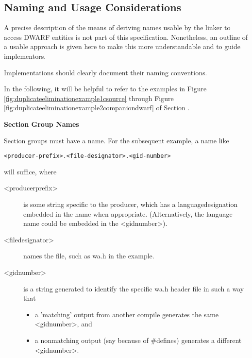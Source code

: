 \subsection{Naming and Usage Considerations}
\label{app:namingandusageconsiderations}

A precise description of the means of deriving names usable
by the linker to access DWARF entities is not part of this
specification. Nonetheless, an outline of a usable approach
is given here to make this more understandable and to guide
implementors.

Implementations should clearly document their naming conventions.

In the following, it will be helpful to refer to the examples
in 
Figure \ref{fig:duplicateeliminationexample1csource}
through 
Figure \ref{fig:duplicateeliminationexample2companiondwarf}
of 
Section .

\textbf{Section Group Names}

Section groups must have a  name.
For the subsequent 
 example, a name like
\begin{alltt}
    <producer-prefix>.<file-designator>.<gid-number>
\end{alltt}
will suffice, where

\begin{description}

\item  [\textless producer\dash prefix\textgreater] 
is some string specific to the
producer, which has a language\dash designation embedded in the
name when appropriate. (Alternatively, the language name
could be embedded in the 
\textless gid\dash number\textgreater).


\item  [\textless file\dash designator\textgreater]
names the file, such as wa.h in
the example.


\item  [\textless gid\dash number\textgreater]
is a string generated to identify the
specific wa.h header file in such a way that

\begin{itemize}

\item  a 'matching' output from another compile generates
the same 
\textless gid\dash number\textgreater,
and

\item  a non\dash matching output (say because of \#defines)
generates a different 
\textless gid\dash number\textgreater.
\end{itemize}

\end{description}

